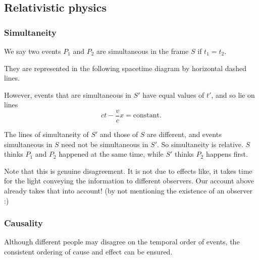 \documentclass[a4paper]{article}
\begin{document}
\subsection{Relativistic physics}
\subsubsection*{Simultaneity}
\begin{defi}
  We say two events $P_1$ and $P_2$ are simultaneous in the frame $S$ if $t_1 = t_2$.
\end{defi}
They are represented in the following spacetime diagram by horizontal dashed lines.

However, events that are simultaneous in $S'$ have equal values of $t'$, and so lie on lines
\[
  ct - \frac{v}{c}x = \text{constant}.
\]

\begin{center}
\end{center}
The lines of simultaneity of $S'$ and those of $S$ are different, and events simultaneous in $S$ need not be simultaneous in $S'$. So simultaneity is relative. $S$ thinks $P_1$ and $P_2$ happened at the same time, while $S'$ thinks $P_2$ happens first.

Note that this is genuine disagreement. It is not due to effects like, it takes time for the light conveying the information to different observers. Our account above already takes that into account! (by not mentioning the existence of an observer :)

\subsubsection*{Causality}
Although different people may disagree on the temporal order of events, the consistent ordering of cause and effect can be ensured.
\end{document}
